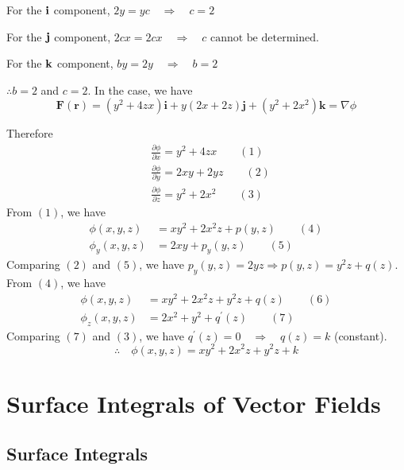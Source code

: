 \documentclass[11pt, a4paper]{MATH2023}
\newcommand{\ii}{{\bf i}}
\newcommand{\jj}{{\bf j}}
\newcommand{\kk}{{\bf k}}
\begin{document}
\begin{spacing}{1.3}
    For the $\ii$ component, $2 y=y c \quad \Rightarrow \quad c=2$

    For the $\jj$ component, $2 c x=2 c x \quad \Rightarrow \quad c \text { cannot be determined. }$
    
    For the $\kk$ component, $b y=2 y \quad \Rightarrow \quad b=2$

    $\therefore b=2$ and $c=2 .$ In the case, we have
    $$\mathbf{F}(\mathbf{r})=\left(y^{2}+4 z x\right) \mathbf{i}+y(2 x+2 z) \mathbf{j}+\left(y^{2}+2 x^{2}\right) \mathbf{k}=\nabla \phi$$
    
    Therefore
    $$\begin{aligned}
    &\frac{\partial \phi}{\partial x}=y^{2}+4 z x \qquad (1)\\
    &\frac{\partial \phi}{\partial y}=2 x y+2 y z \qquad (2)\\
    &\frac{\partial \phi}{\partial z}=y^{2}+2 x^{2} \qquad (3)
    \end{aligned}$$
    From $(1)$, we have
    $$\begin{aligned}
    \phi(x, y, z) &=x y^{2}+2 x^{2} z+p(y, z) \qquad (4)\\
    \phi_{y}(x, y, z) &=2 x y+p_{y}(y, z) \qquad (5)
    \end{aligned}$$
    Comparing $(2)$ and $(5)$, we have $p_{y}(y, z)=2 y z \Rightarrow p(y, z)=y^{2} z+q(z) .$ From $(4)$, we have
    $$\begin{aligned}
    \phi(x, y, z) &=x y^{2}+2 x^{2} z+y^{2} z+q(z) \qquad(6)\\
    \phi_{z}(x, y, z) &=2 x^{2}+y^{2}+q^{\prime}(z) \qquad(7)
    \end{aligned}$$
    Comparing $(7)$ and $(3)$, we have $q^{\prime}(z)=0 \quad \Rightarrow \quad q(z)=k$ (constant).
    $$\therefore \quad \phi(x, y, z)=x y^{2}+2 x^{2} z+y^{2} z+k$$

    \newpage
    \section{Surface Integrals of Vector Fields}
    \subsection{Surface Integrals}


\end{spacing}
\end{document}
